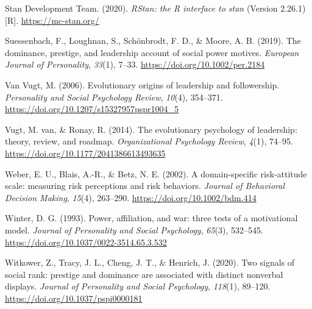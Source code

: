 \documentclass[
  donotrepeattitle,doc, 12pt, a4paper,floatsintext]{apa7}
\newlength{\cslhangindent}
\newlength{\cslentryspacingunit} %
\newenvironment{CSLReferences}[2] %
 {%
  \setlength{\parindent}{0pt}
  \ifodd #1
  \let\oldpar\par
  \def\par{\hangindent=\cslhangindent\oldpar}
  \fi
  \setlength{\parskip}{#2\cslentryspacingunit}
 }%
 {}
\begin{document}
\begin{CSLReferences}{1}{0}
\leavevmode{}%
Stan Development Team. (2020). \emph{RStan: the R interface to stan} (Version 2.26.1) {[}R{]}. \url{https://mc-stan.org/}

\leavevmode{}%
Suessenbach, F., Loughnan, S., Schönbrodt, F. D., \& Moore, A. B. (2019). The dominance, prestige, and leadership account of social power motives. \emph{European Journal of Personality}, \emph{33}(1), 7--33. \url{https://doi.org/10.1002/per.2184}

\leavevmode{}%
Van Vugt, M. (2006). Evolutionary origins of leadership and followership. \emph{Personality and Social Psychology Review}, \emph{10}(4), 354--371. \url{https://doi.org/10.1207/s15327957pspr1004_5}

\leavevmode{}%
Vugt, M. van, \& Ronay, R. (2014). The evolutionary psychology of leadership: theory, review, and roadmap. \emph{Organizational Psychology Review}, \emph{4}(1), 74--95. \url{https://doi.org/10.1177/2041386613493635}

\leavevmode{}%
Weber, E. U., Blais, A.-R., \& Betz, N. E. (2002). A domain-specific risk-attitude scale: measuring risk perceptions and risk behaviors. \emph{Journal of Behavioral Decision Making}, \emph{15}(4), 263--290. \url{https://doi.org/10.1002/bdm.414}

\leavevmode{}%
Winter, D. G. (1993). Power, affiliation, and war: three tests of a motivational model. \emph{Journal of Personality and Social Psychology}, \emph{65}(3), 532--545. \url{https://doi.org/10.1037/0022-3514.65.3.532}

\leavevmode{}%
Witkower, Z., Tracy, J. L., Cheng, J. T., \& Henrich, J. (2020). Two signals of social rank: prestige and dominance are associated with distinct nonverbal displays. \emph{Journal of Personality and Social Psychology}, \emph{118}(1), 89--120. \url{https://doi.org/10.1037/pspi0000181}

\end{CSLReferences}

\endgroup

\newpage
\end{document}
